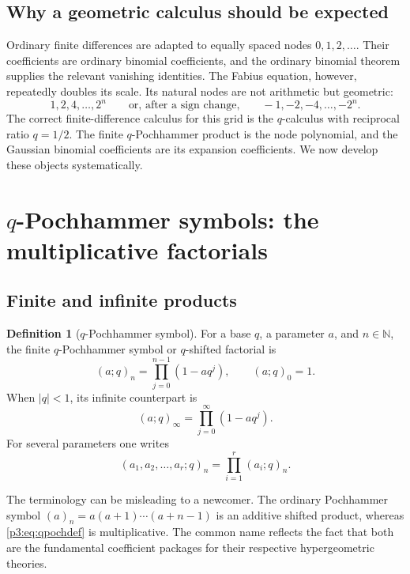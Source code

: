 \documentclass[11pt,oneside]{article}
\theoremstyle{definition}
\newtheorem{definition}[theorem]{Definition}
\theoremstyle{remark}
\newcommand{\qpoch}[3]{\left(#1;#2\right)_{#3}}
\newcommand{\N}{\mathbb N}
\begin{document}
\subsection{Why a geometric calculus should be expected}

Ordinary finite differences are adapted to equally spaced nodes $0,1,2,\ldots$.  Their coefficients are ordinary binomial coefficients, and the ordinary binomial theorem supplies the relevant vanishing identities.  The Fabius equation, however, repeatedly doubles its scale.  Its natural nodes are not arithmetic but geometric:
\[
  1,2,4,\ldots,2^n
  \qquad\text{or, after a sign change,}\qquad
  -1,-2,-4,\ldots,-2^n.
\]
The correct finite-difference calculus for this grid is the $q$-calculus with reciprocal ratio $q=1/2$.  The finite $q$-Pochhammer product is the node polynomial, and the Gaussian binomial coefficients are its expansion coefficients.  We now develop these objects systematically.

\section{\texorpdfstring{$q$-Pochhammer symbols}{q-Pochhammer symbols}: the multiplicative factorials}

\subsection{Finite and infinite products}

\begin{definition}[$q$-Pochhammer symbol]
For a base $q$, a parameter $a$, and $n\in\N$, the finite $q$-Pochhammer symbol or $q$-shifted factorial is
\begin{equation}\label{p3:eq:qpochdef}
  \qpoch{a}{q}{n}=\prod_{j=0}^{n-1}(1-aq^j),
  \qquad \qpoch{a}{q}{0}=1.
\end{equation}
When $|q|<1$, its infinite counterpart is
\begin{equation}\label{p3:eq:qpochinf}
  \qpoch{a}{q}{\infty}=\prod_{j=0}^{\infty}(1-aq^j).
\end{equation}
For several parameters one writes
\[
  \qpoch{a_1,a_2,\ldots,a_r}{q}{n}
   =\prod_{i=1}^{r}\qpoch{a_i}{q}{n}.
\]
\end{definition}

The terminology can be misleading to a newcomer.  The ordinary Pochhammer symbol $(a)_n=a(a+1)\cdots(a+n-1)$ is an additive shifted product, whereas \eqref{p3:eq:qpochdef} is multiplicative.  The common name reflects the fact that both are the fundamental coefficient packages for their respective hypergeometric theories.
\end{document}
